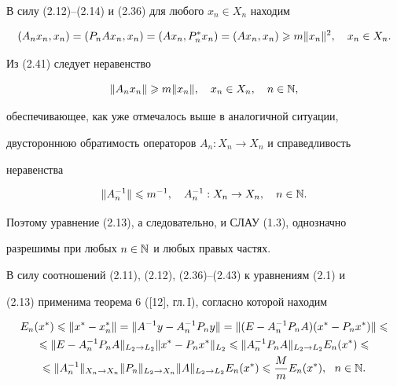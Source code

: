 В силу (2.12)--(2.14) и (2.36) для любого $x_n\in X_n$ находим


\begin{equation}


(A_nx_n,x_n)=(P_nAx_n,x_n) = (Ax_n,P_n^*x_n) = (Ax_n,x_n)\gea


m\|x_n\|^2,\quad x_n\in X_n.


\end{equation}


Из (2.41) следует неравенство


\begin{equation}


\|A_nx_n\|\gea m\|x_n\|,\quad x_n\in X_n,\quad n\in \N,


\end{equation}


обеспечивающее, как уже отмечалось выше в аналогичной ситуации,


двустороннюю обратимость операторов $A_n:X_n\to X_n$ и справедливость


неравенства


\begin{equation}


\|A_n^{-1}\|\lea m^{-1},\quad A_n^{-1}:X_n\to X_n,\quad n\in\N.


\end{equation}


Поэтому уравнение (2.13), а следовательно, и СЛАУ (1.3), однозначно


разрешимы при любых $n\in \Bbb N$ и любых правых частях.





В силу соотношений (2.11), (2.12), (2.36)--(2.43) к уравнениям (2.1) и


(2.13) применима теорема 6 ([12], гл.\,I), согласно которой находим


\begin{multline}


E_n(x^*)\lea \|x^* - x_n^*\| = \|A^{-1}y - A_n^{-1}P_ny\| = \|(E-A^{-


1}_nP_nA)(x^* - P_nx^*)\|\lea \\


\lea \|E - A_n^{-1}P_nA\|_{L_2\to L_2}\|x^* - P_nx^*\|_{L_2}\lea \|A_n^{-


1}P_nA\|_{L_2\to L_2} E_n(x^*)\lea \\


\lea \|A_n^{-1}\|_{X_n\to X_n}\|P_n\|_{L_2\to X_n}\|A\|_{L_2\to L_2}


E_n(x^*)\lea \frac{M}{m}E_n(x^*),\ \ n\in\N.


\end{multline}


